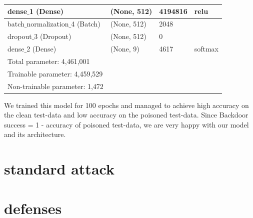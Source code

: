 \documentclass[a4paper,12pt]{report}
\begin{document}
\begin{center}
\begin{tabular}{|l l l l|}
	dense$\_$1 (Dense) & (None, 512)    & 4194816   & relu \\ \hline
	batch$\_$normalization$\_$4 (Batch) & (None, 512)    & 2048   &\\ \hline
	dropout$\_$3 (Dropout) & (None, 512)    & 0  & \\ \hline
	dense$\_$2 (Dense) & (None, 9)    & 4617  & softmax\\ \hline \hline
	Total parameter: 4,461,001 & & & \\
	Trainable parameter: 4,459,529 & & & \\
	Non-trainable parameter: 1,472 & & & \\ \hline
\end{tabular} 
\end{center}
We trained this model for 100 epochs and managed to achieve high accuracy on the clean test-data and low accuracy on the poisoned test-data. Since Backdoor success = 1 - accuracy of poisoned test-data, we are very happy with our model and its architecture. 
\section{standard attack}

\section{defenses}
\end{document}

